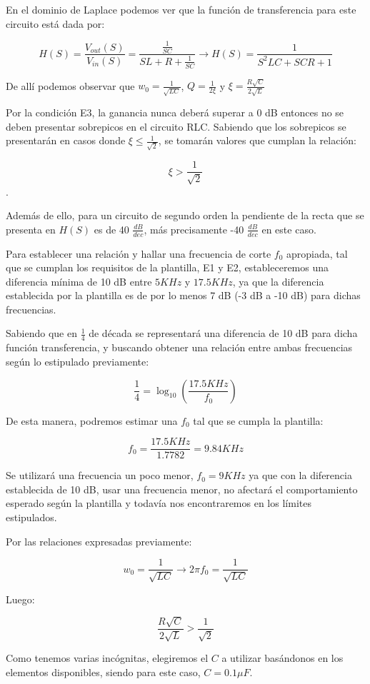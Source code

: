 En el dominio de Laplace podemos ver que la función de transferencia para este circuito está dada por:

$$H(S)=\frac{V_{out}(S)}{V_{in}(S)}=\frac{\frac{1}{SC}}{SL+R+\frac{1}{SC}} \longrightarrow 
H(S)=\frac{1}{S^2LC+SCR+1}$$

De allí podemos observar que $w_0=\frac{1}{\sqrt{LC}}$, $Q=\frac{1}{2\xi}$ y $\xi=\frac{R\sqrt{C}}{2\sqrt{L}}$

Por la condición E3, la ganancia nunca deberá superar a 0 dB entonces no se deben presentar sobrepicos en el circuito RLC.
Sabiendo que los sobrepicos se presentarán en casos donde $\xi \leq \frac{1}{\sqrt{2}}$, se tomarán valores que cumplan la relación:

$$\xi > \frac{1}{\sqrt{2}}$$.

Además de ello, para un circuito de segundo orden la pendiente de la recta que se presenta en $H(S)$ es de 
40 $\frac{dB}{dec}$, más precisamente -40 $\frac{dB}{dec}$ en este caso. 

Para establecer una relación y hallar una frecuencia de corte $f_0$ apropiada, tal que se cumplan los requisitos
de la plantilla, E1 y E2, estableceremos una diferencia mínima de 10 dB entre $5 KHz$ y $17.5 KHz$, ya que la diferencia establecida por la plantilla
es de por lo menos 7 dB (-3 dB a -10 dB) para dichas frecuencias.

Sabiendo que en $\frac{1}{4}$ de década se representará una diferencia de 10 dB para dicha función transferencia, y buscando obtener una
relación entre ambas frecuencias según lo estipulado previamente:

$$\frac{1}{4}=\log_{10}(\frac{17.5KHz}{f_0})$$

De esta manera, podremos estimar una $f_0$ tal que se cumpla la plantilla:

$$f_0 = \frac{17.5KHz}{1.7782} = 9.84 KHz$$

Se utilizará una frecuencia un poco menor, $f_0=9 KHz$ ya que con la diferencia establecida de 10 dB, usar una frecuencia menor, no afectará el comportamiento 
esperado según la plantilla y todavía nos encontraremos en los límites estipulados.

Por las relaciones expresadas previamente:

$$w_0=\frac{1}{\sqrt{LC}} \longrightarrow 2\pi f_0=\frac{1}{\sqrt{LC}}$$

Luego:

$$\frac{R\sqrt{C}}{2\sqrt{L}} > \frac{1}{\sqrt{2}}$$

Como tenemos varias incógnitas, elegiremos el $C$ a utilizar basándonos en los elementos disponibles, siendo para este caso,
$C=0.1\mu F$.

